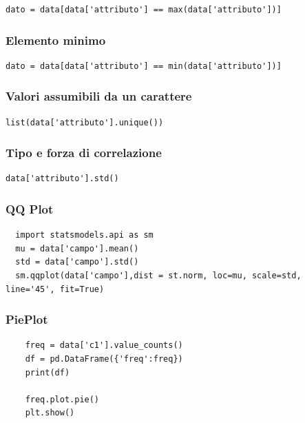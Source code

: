\documentclass{article}
\begin{document}
\begin{lstlisting}
dato = data[data['attributo'] == max(data['attributo'])]
\end{lstlisting}

\subsubsection*{Elemento minimo}

\begin{lstlisting}
dato = data[data['attributo'] == min(data['attributo'])]
\end{lstlisting}

\subsubsection*{Valori assumibili da un carattere}

\begin{lstlisting}
list(data['attributo'].unique())
\end{lstlisting}

\subsubsection*{Tipo e forza di correlazione}

\begin{lstlisting}
data['attributo'].std()
\end{lstlisting}

\subsubsection*{QQ Plot}

\begin{lstlisting}
  import statsmodels.api as sm
  mu = data['campo'].mean()
  std = data['campo'].std()
  sm.qqplot(data['campo'],dist = st.norm, loc=mu, scale=std, line='45', fit=True)
\end{lstlisting}

\subsubsection*{PiePlot}

\begin{lstlisting}
    freq = data['c1'].value_counts()
    df = pd.DataFrame({'freq':freq})
    print(df)

    freq.plot.pie()
    plt.show()
\end{lstlisting}
\end{document}
